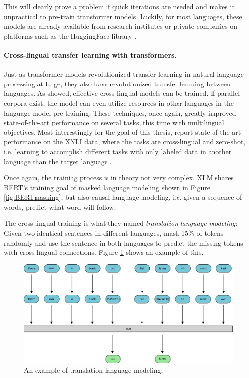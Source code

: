\documentclass[nofilelist]{cslthse-msc}
\begin{document}
This will clearly prove a problem if quick iterations are needed and makes it unpractical to pre-train transformer models. Luckily, for most languages, these models are already available from research institutes or private companies on platforms such as the HuggingFace library \citep{Wolf2019HuggingFacesTS}.

\paragraph{Cross-lingual transfer learning with transformers.}
Just as transformer models revolutionized transfer learning in natural language processing at large, they also have revolutionized transfer learning between languages. As \citet{DBLP:journals/corr/abs-1901-07291} showed, effective cross-lingual models can be trained. If parallel corpora exist, the model can even utilize resources in other languages in the language model pre-training. These techniques, once again, greatly improved state-of-the-art performance on several tasks, this time with multilingual objectives. Most interestingly for the goal of this thesis, \citeauthor{DBLP:journals/corr/abs-1901-07291}  report state-of-the-art performance on the XNLI data, where the tasks are cross-lingual and zero-shot, i.e. learning to accomplish different tasks with only labeled data in another language than the target language \citep{DBLP:journals/corr/abs-1809-05053}.

Once again, the training process is in theory not very complex. XLM shares BERT's training goal of masked language modeling shown in Figure \ref{fig:BERTmasking}, but also causal language modeling, i.e. given a sequence of words, predict what word will follow.

The cross-lingual training is what they named \emph{translation language modeling}: Given two identical sentences in different languages, mask 15\% of tokens randomly and use the sentence in both languages to predict the missing tokens with cross-lingual connections. Figure \ref{fig:TLM} shows an example of this.

\begin{figure}[ht]
    \centering
    \includegraphics[width=\textwidth]{LTMmasking.pdf}
    \caption{An example of translation language modeling.}
    \label{fig:TLM}
\end{figure}
\end{document}

